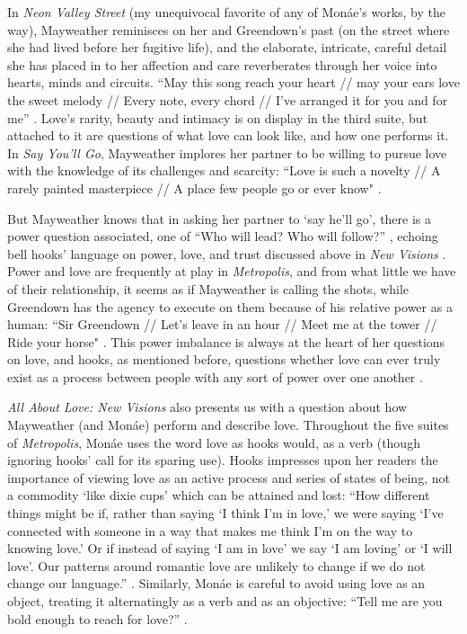 \documentclass[a4paper, 11pt]{article} %
\begin{document}
In \emph{Neon Valley Street} (my unequivocal favorite of any of Mon\'ae's works, by the way), Mayweather reminisces on her and Greendown's past (on the street where she had lived before her fugitive life), and the elaborate, intricate, careful detail she has placed in to her affection and care reverberates through her voice into hearts, minds and circuits.
``May this song reach your heart // may your ears love the sweet melody // Every note, every chord // I've arranged it for you and for me'' \cite{neonvalleystreet}.
Love's rarity, beauty and intimacy is on display in the third suite, but attached to it are questions of what love can look like, and how one performs it.
In \emph{Say You'll Go}, Mayweather implores her partner to be willing to pursue love with the knowledge of its challenges and scarcity:
``Love is such a novelty // A rarely painted masterpiece // A place few people go or ever know" \cite{sayyouwillgo}.

But Mayweather knows that in asking her partner to `say he'll go', there is a power question associated, one of ``Who will lead? Who will follow?''
 \cite{sayyouwillgo}, echoing bell hooks' language on power, love, and trust discussed above in \emph{New Visions} \cite{newvisions}.
Power and love are frequently at play in \emph{Metropolis}, and from what little we have of their relationship, it seems as if Mayweather is calling the shots, while Greendown has the agency to execute on them because of his relative power as a human: ``Sir Greendown // Let's leave in an hour // Meet me at the tower // Ride your horse" \cite{greendown}.
This power imbalance is always at the heart of her questions on love, and hooks, as mentioned before, questions whether love can ever truly exist as a process between people with any sort of power over one another \cite{newvisions}.

\emph{All About Love: New Visions} also presents us with a question about how Mayweather (and Mon\'ae) perform and describe love.
Throughout the five suites of \emph{Metropolis}, Mon\'ae uses the word love as hooks would, as a verb (though ignoring hooks' call for its sparing use).
Hooks impresses upon her readers the importance of viewing love as an active process and series of states of being, not a commodity `like dixie cups' which can be attained and lost:
``How different things might be if, rather than saying `I think I'm in love,' we were saying `I've connected with someone in a way that makes me think I'm on the way to knowing love.' Or if instead of saying `I am in love' we say `I am loving' or `I will love'. Our patterns around romantic love are unlikely to change if we do not change our language.'' \cite{newvisions}.
Similarly, Mon\'ae is careful to avoid using love as an object, treating it alternatingly as a verb and as an objective: ``Tell me are you bold enough to reach for love?'' \cite{manymoons}.
\end{document}
